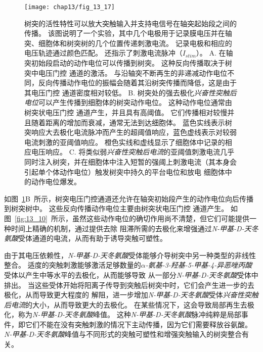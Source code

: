 \begin{figure}[htbp]
	\centering
	\texttt{[image: chap13/fig\_13\_17]}
	\caption{树突的活性特性可以放大突触输入并支持电信号在轴突起始段之间的传播。
		该图说明了一个实验，其中几个电极用于记录膜电压并在轴突、细胞体和树突树的几个位置传递刺激电流。
		记录电极和相应的电压轨迹通过颜色匹配。
		还指示了刺激电流脉冲（$I_{stim}$）\cite{stuart2016dendrites}。
		A. 在轴突初始段启动的动作电位可以传播到树突。
		这种反向传播取决于树突中电压门控  通道的激活。
		与沿轴突不断再生的非递减动作电位不同，反向传播动作电位的振幅会随着其沿树突传播而降低，这是由于其电压门控  通道密度相对较低。
		B. 树突处的强去极化\textit{兴奋性突触后电位}可以产生传播到细胞体的树突动作电位。
		这种动作电位通常由树突状电压门控  通道产生，并且具有高阈值。
		它们传播相对较慢并且随着距离的增加而衰减，通常无法到达细胞体。
		蓝色实线表示树突响应大去极化电流脉冲而产生的超阈值响应，蓝色虚线表示对较弱电流刺激的亚阈值响应。
		橙色实线和虚线显示了细胞体中记录的相应电压响应。
		C. 将类似弱\textit{兴奋性突触后电流}的亚阈值刺激电流几乎同时注入树突，并在细胞体中注入短暂的强阈上刺激电流（其本身会引起单个体动作电位）触发树突中持久的平台电位和放电 细胞体中的动作电位爆发\cite{larkum1999new}。}
	\label{fig:13_17}
\end{figure}


如图~\ref{fig:13_17}B~所示，树突电压门控通道还允许在轴突初始段产生的动作电位向后传播到树突树中。
这些反向传播动作电位主要由树突状电压门控  通道产生。
如图~\ref{fig:13_10}~所示，虽然这些动作电位的确切作用尚不清楚，但它们可能提供一种时间上精确的机制，通过提供去除  阻滞所需的去极化来增强通过\textit{N-甲基-D-天冬氨酸}受体通道的电流，从而有助于诱导突触可塑性。


由于其电压依赖性，\textit{N-甲基-D-天冬氨酸}受体能够介导树突中另一种类型的非线性整合。
适度的突触刺激能够激活足够数量的\textit{$\alpha$-氨基-3-羟基-5-甲基-4-异恶唑丙酸}受体以产生中等水平的去极化，从而能够导致  从一部分\textit{N-甲基-D-天冬氨酸}受体中排出。
当这些受体开始将阳离子传导到突触后树突中时，它们会产生进一步的去极化，从而导致更大程度的  解阻，进一步增加\textit{N-甲基-D-天冬氨酸}受体\textit{兴奋性突触后电流}的大小，从而导致更大的去极化。
在某些情况下，这会导致局部再生去极化，称为\textit{N-甲基-D-天冬氨酸}峰值。
这种\textit{N-甲基-D-天冬氨酸}脉冲纯粹是局部事件，即它们不能在没有突触刺激的情况下主动传播，因为它们需要释放谷氨酸。
\textit{N-甲基-D-天冬氨酸}峰值与不同形式的突触可塑性和增强突触输入的树突整合有关。


